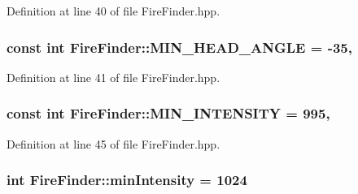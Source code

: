 Definition at line 40 of file Fire\-Finder.\-hpp.

\hypertarget{classFireFinder_ac6743699fd08f97088855dc1e87f8dea}{
\subsubsection[{M\-I\-N\-\_\-\-H\-E\-A\-D\-\_\-\-A\-N\-G\-L\-E}]{\setlength{\rightskip}{0pt plus 5cm}const int Fire\-Finder\-::\-M\-I\-N\-\_\-\-H\-E\-A\-D\-\_\-\-A\-N\-G\-L\-E = -\/35\hspace{0.3cm}{\ttfamily [static]}, {\ttfamily [private]}}}\label{classFireFinder_ac6743699fd08f97088855dc1e87f8dea}


Definition at line 41 of file Fire\-Finder.\-hpp.

\hypertarget{classFireFinder_aa05ce7d7760ac59ea294df68475dcf05}{
\subsubsection[{M\-I\-N\-\_\-\-I\-N\-T\-E\-N\-S\-I\-T\-Y}]{\setlength{\rightskip}{0pt plus 5cm}const int Fire\-Finder\-::\-M\-I\-N\-\_\-\-I\-N\-T\-E\-N\-S\-I\-T\-Y = 995\hspace{0.3cm}{\ttfamily [static]}, {\ttfamily [private]}}}\label{classFireFinder_aa05ce7d7760ac59ea294df68475dcf05}


Definition at line 45 of file Fire\-Finder.\-hpp.

\hypertarget{classFireFinder_a7d3912a911843b60de3468588cfe8579}{
\subsubsection[{min\-Intensity}]{\setlength{\rightskip}{0pt plus 5cm}int Fire\-Finder\-::min\-Intensity = 1024\hspace{0.3cm}{\ttfamily [private]}}}\label{classFireFinder_a7d3912a911843b60de3468588cfe8579}


